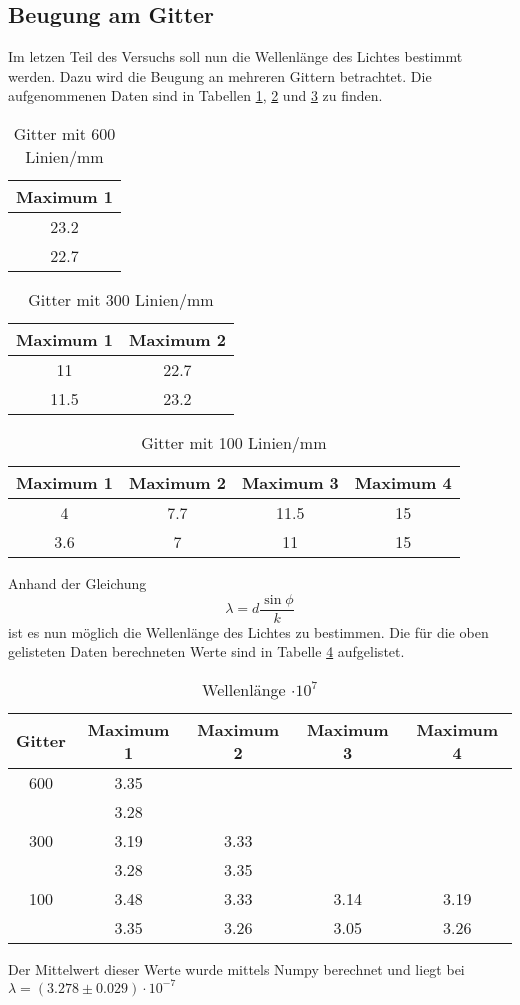 \subsection{Beugung am Gitter}
  Im letzen Teil des Versuchs soll nun die Wellenlänge des Lichtes bestimmt werden. Dazu 
  wird die Beugung an mehreren Gittern betrachtet. Die aufgenommenen Daten sind in Tabellen \ref{tab:gitter1},
  \ref{tab:gitter2} und \ref{tab:gitter3} zu finden.
  \begin{table}[H]
    \centering
    \caption{Gitter mit 600 Linien/mm}
    \begin{tabular}{c}
      \toprule
      Maximum 1\\
      \midrule
      23.2 \\
      22.7 \\
      \bottomrule
    \end{tabular}
    \label{tab:gitter1}
  \end{table}
  \begin{table}[H]
    \centering
    \caption{Gitter mit 300 Linien/mm}
    \begin{tabular}{c c}
      \toprule
      Maximum 1 & Maximum 2\\
      \midrule
      11   & 22.7 \\
      11.5 & 23.2 \\
      \bottomrule
    \end{tabular}
    \label{tab:gitter2}
  \end{table}
  \begin{table}[H]
    \centering
    \caption{Gitter mit 100 Linien/mm}
    \begin{tabular}{c c c c}
      \toprule
      Maximum 1 & Maximum 2 & Maximum 3 & Maximum 4\\
      \midrule
      4   & 7.7 & 11.5 & 15 \\
      3.6 & 7   & 11   & 15 \\
      \bottomrule
    \end{tabular}
    \label{tab:gitter3}
  \end{table}
  \noindent Anhand der Gleichung 
  \begin{equation*}
    \lambda = d \dfrac{\sin{\phi}}{k}
  \end{equation*}
  ist es nun möglich die Wellenlänge des Lichtes zu bestimmen. Die für die oben 
  gelisteten Daten berechneten Werte sind in Tabelle \ref{tab:wellen} aufgelistet.
  \begin{table}[H]
    \centering
    \caption{Wellenlänge $\cdot 10^{7}$}
    \begin{tabular}{c c c c c}
      \toprule
      Gitter & Maximum 1 & Maximum 2 & Maximum 3 & Maximum 4\\
      \midrule
      600&3.35   &&&\\
      &3.28&&&\\
      300&3.19& 3.33&& \\
      &3.28&3.35&&\\
      100&  3.48   &   3.33&  3.14&3.19 \\
      &3.35&3.26&3.05&3.26\\
      \bottomrule
    \end{tabular}
    \label{tab:wellen}
  \end{table}
  \noindent Der Mittelwert dieser Werte wurde mittels Numpy berechnet und liegt bei 
  $\lambda=(3.278\pm0.029)\cdot 10^{-7}$